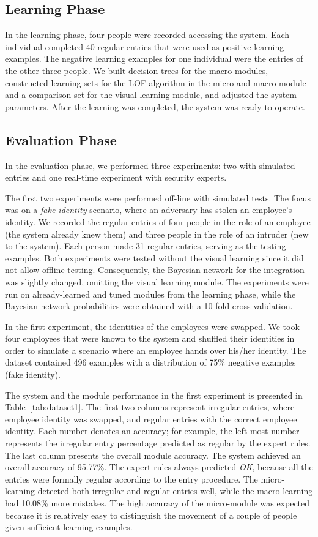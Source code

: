 \subsection{Learning Phase}
In the learning phase, four people were recorded accessing the system. Each individual completed 40 regular entries that were used as positive learning examples. The negative learning examples for one individual were the entries of the other three people. We built decision trees for the macro-modules, constructed learning sets for the LOF algorithm in the micro-and macro-module and a comparison set for the visual learning module, and adjusted the system parameters. After the learning was completed, the system was ready to operate. 


\subsection{Evaluation Phase}
In the evaluation phase, we performed three experiments: two with simulated entries and one real-time experiment with security experts. 

The first two experiments were performed off-line with simulated tests. The focus was on a \textit{fake-identity} scenario, where an adversary has stolen an employee's identity. We recorded the regular entries of four people in the role of an employee (the system already knew them) and three people in the role of an intruder (new to the system). Each person made 31 regular entries, serving as the testing examples. Both experiments were tested without the visual learning since it did not allow offline testing. Consequently, the Bayesian network for the integration was slightly changed, omitting the visual learning module. The experiments were run on already-learned and tuned modules from the learning phase, while the Bayesian network probabilities were obtained with a 10-fold cross-validation.

In the first experiment, the identities of the employees were swapped. We took four employees that were known to the system and shuffled their identities in order to simulate a scenario where an employee hands over his/her identity. The dataset contained 496 examples with a distribution of 75\% negative examples (fake identity). 

The system and the module performance in the first experiment is presented in Table~\ref{tab:dataset1}. The first two columns represent irregular entries, where employee identity was swapped, and regular entries with the correct employee identity. Each number denotes an accuracy; for example, the left-most number represents the irregular entry percentage predicted as regular by the expert rules. The last column presents the overall module accuracy. The system achieved an overall accuracy of 95.77\%. The expert rules always predicted \textit{OK}, because all the entries were formally regular according to the entry procedure. The micro-learning detected both irregular and regular entries well, while the macro-learning had 10.08\% more mistakes. The high accuracy of the micro-module was expected because it is relatively easy to distinguish the movement of a couple of people given sufficient learning examples.

